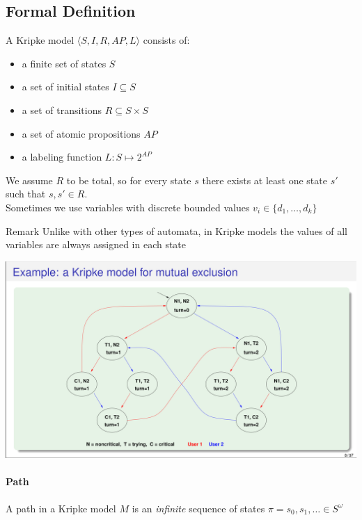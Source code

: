 \documentclass{article}
\begin{document}
\subsection{Formal Definition}
A Kripke model $\langle S, I, R, AP, L\rangle$ consists of:
\begin{itemize}
    \item a finite set of states $S$
    \item a set of initial states $I \subseteq S$
    \item a set of transitions $R\subseteq S\times S$
    \item a set of atomic propositions $AP$
    \item a labeling function $L: S\mapsto 2^{AP}$
\end{itemize}

We assume $R$ to be total, so for every state $s$ there exists at least one state $s'$ such that $s,s'\in R$.\\
Sometimes we use variables with discrete bounded values $v_i\in\{d_1,\dots,d_k\}$

\begin{callout}{Remark}
    Unlike with other types of automata, in Kripke models the values of all variables are always assigned in each state
\end{callout}

\begin{center}
    \includegraphics[width=1\linewidth]{images/kripke_example.png}
\end{center}

\paragraph{Path} A path in a Kripke model $M$ is an \textit{infinite} sequence of states $\pi = s_0, s_1, \dots \in S^\omega$
\end{document}
